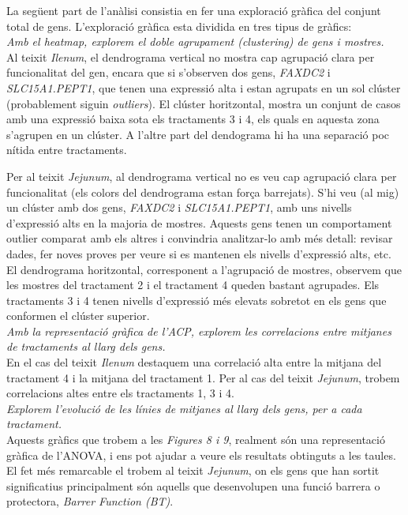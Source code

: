 \documentclass[english]{article}
\begin{document}
La següent part de l'anàlisi consistia en fer una exploració gràfica del conjunt total de gens. L'exploració gràfica esta dividida en tres tipus de gràfics:
\\

\textit{ Amb el heatmap, explorem el doble agrupament (clustering) de gens i mostres.}
\\

Al teixit \textit{Ilenum}, el dendrograma vertical no mostra cap agrupació clara per funcionalitat del gen, encara que si s'observen dos gens, \textit{FAXDC2} i \textit{SLC15A1.PEPT1}, que tenen una expressió alta i estan agrupats en un sol clúster (probablement siguin \textit{outliers}). El clúster horitzontal, mostra un conjunt de casos amb una expressió baixa sota els tractaments 3 i 4, els quals en aquesta zona s'agrupen en un clúster. A l'altre part del dendograma hi ha una separació poc nítida entre tractaments.

Per al teixit \textit{Jejunum}, al dendrograma vertical no es veu cap agrupació clara per funcionalitat (els colors del dendrograma estan força barrejats). S’hi veu (al mig) un clúster amb dos gens, \textit{FAXDC2} i \textit{SLC15A1.PEPT1}, amb uns nivells d’expressió alts en la majoria de mostres. Aquests gens tenen un comportament outlier comparat amb els altres i convindria analitzar-lo amb més detall: revisar dades, fer noves proves per veure si es mantenen els nivells d’expressió alts, etc. El dendrograma horitzontal, corresponent a l'agrupació de mostres, observem que les mostres del tractament 2 i el tractament 4 queden bastant agrupades. Els tractaments 3 i 4 tenen nivells d'expressió més elevats sobretot en els gens que conformen el clúster superior.
\\

\textit{ Amb la representació gràfica de l'ACP, explorem les correlacions entre mitjanes de tractaments al llarg dels gens.}
\\

En el cas del teixit \textit{Ilenum} destaquem una correlació alta entre la mitjana del tractament 4 i la mitjana del tractament 1. Per al cas del teixit \textit{Jejunum}, trobem correlacions altes entre els tractaments 1, 3 i 4.
\\

\textit{ Explorem l'evolució de les línies de mitjanes al llarg dels gens, per a cada tractament.}
\\

Aquests gràfics que trobem a les \textit{Figures 8 i 9}, realment són una representació gràfica de l'ANOVA, i ens pot ajudar a veure els resultats obtinguts a les taules. El fet més remarcable el trobem al teixit \textit{Jejunum}, on els gens que han sortit significatius principalment són aquells que desenvolupen una funció barrera o protectora, \emph{Barrer Function (BT)}.
\\
\end{document}
